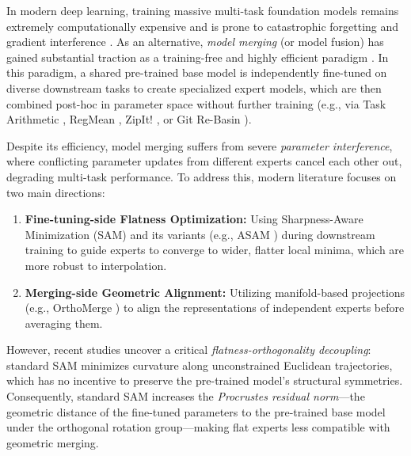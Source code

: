 \documentclass{article}
\theoremstyle{plain}
\theoremstyle{definition}
\theoremstyle{remark}
\begin{document}
In modern deep learning, training massive multi-task foundation models remains extremely computationally expensive and is prone to catastrophic forgetting and gradient interference \cite{kirkpatrick17,de2021continual} \cite{zenke2017continual,aljundi2018memory,chaudhry2018riemannian}. As an alternative, \textit{model merging} (or model fusion) has gained substantial traction as a training-free and highly efficient paradigm \cite{lu24,tang2024merging}. In this paradigm, a shared pre-trained base model is independently fine-tuned on diverse downstream tasks to create specialized expert models, which are then combined post-hoc in parameter space without further training (e.g., via Task Arithmetic \cite{ilharco22,yadav23}, RegMean \cite{jin2022regmean,matena2022merging}, ZipIt! \cite{stoica2023zip}, or Git Re-Basin \cite{ainsworth2022git}).

Despite its efficiency, model merging suffers from severe \textit{parameter interference}, where conflicting parameter updates from different experts cancel each other out, degrading multi-task performance. To address this, modern literature focuses on two main directions:
\begin{enumerate}\setlength{\itemsep}{0pt}\setlength{\parskip}{0pt}\setlength{\parsep}{0pt}
    \item \textbf{Fine-tuning-side Flatness Optimization:} Using Sharpness-Aware Minimization (SAM) \cite{foret21} and its variants (e.g., ASAM \cite{kwon21,zhuang2022surrogate} \cite{mi2022make,du2022efficient} \cite{liu2022towards,wen2023penalizing} \cite{jeon2024friendly,muller2024sharpness} \cite{zhao2024sam,kim2024scale}) during downstream training to guide experts to converge to wider, flatter local minima, which are more robust to interpolation.
    \item \textbf{Merging-side Geometric Alignment:} Utilizing manifold-based projections (e.g., OrthoMerge \cite{spor25,sata25} \cite{sbf25,guerry2024geometry} \cite{marconi2024papas}) to align the representations of independent experts before averaging them.
\end{enumerate}

However, recent studies \cite{spor25} uncover a critical \textit{flatness-orthogonality decoupling}: standard SAM minimizes curvature along unconstrained Euclidean trajectories, which has no incentive to preserve the pre-trained model's structural symmetries. Consequently, standard SAM increases the \textit{Procrustes residual norm}—the geometric distance of the fine-tuned parameters to the pre-trained base model under the orthogonal rotation group—making flat experts less compatible with geometric merging.
\end{document}
